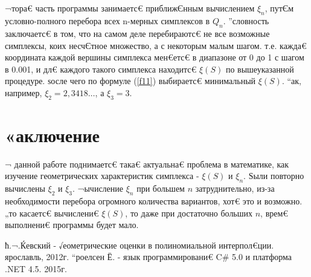 \documentclass[12pt]{article} %
\begin{document}
\subparagraph{}¬тора€ часть программы занимаетс€ приближЄнным вычислением $\xi_n$, путЄм условно-полного перебора всех n-мерных симплексов в $Q_n$. ”словность заключаетс€ в том, что на самом деле перебираютс€ не все возможные симплексы, коих несчЄтное множество, а с некоторым малым шагом. т.е. кажда€ координата каждой вершины симплекса мен€етс€ в диапазоне от 0 до 1 с шагом в 0.001, и дл€ каждого такого симплекса находитс€ $\xi(S)$ по вышеуказанной процедуре. ѕосле чего по формуле (\ref{f11}) выбираетс€ минимальный $\xi(S)$. “ак, например, $\xi_2 = 2,3418\dots$, а $\xi_3 = 3$. 



\newpage
\section{«аключение}
¬ данной работе поднимаетс€ така€ актуальна€ проблема в математике, как изучение геометрических характеристик симплекса - $\xi(S)$ и $\xi_n$. Ѕыли повторно вычислены $\xi_2$ и $\xi_3$. ¬ычисление $\xi_n$ при большем $n$ затруднительно, из-за необходимости перебора огромного количества вариантов, хот€ это и возможно. „то касаетс€ вычислени€ $\xi(S)$, то даже при достаточно больших $n$, врем€ выполнени€ программы будет мало.

\newpage
\begin{thebibliography}{}
	 ћ.¬.Ќевский - √еометрические оценки в полиномиальной интерпол€ции. ярославль, 2012г.
	 “роелсен Ё. - язык программировани€ C$\#$ 5.0 и платформа .NET 4.5. 2015г.
\end{thebibliography}


\newpage
\end{document}
